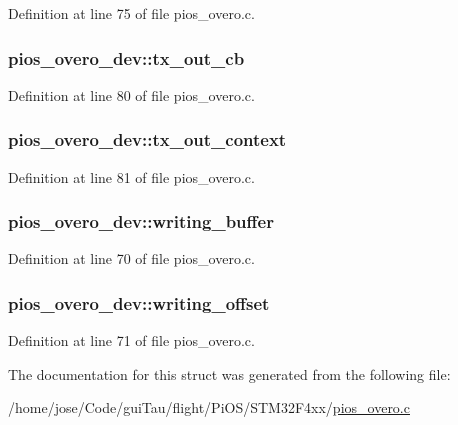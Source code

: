 Definition at line 75 of file pios\-\_\-overo.\-c.

\hypertarget{structpios__overo__dev_a6814eae0437a37c8b5319b0ef88b7459}{
\subsubsection[{tx\-\_\-out\-\_\-cb}]{ pios\-\_\-overo\-\_\-dev\-::tx\-\_\-out\-\_\-cb}}\label{structpios__overo__dev_a6814eae0437a37c8b5319b0ef88b7459}


Definition at line 80 of file pios\-\_\-overo.\-c.

\hypertarget{structpios__overo__dev_aae8b1053ce480f2829ac18c7a490c010}{
\subsubsection[{tx\-\_\-out\-\_\-context}]{ pios\-\_\-overo\-\_\-dev\-::tx\-\_\-out\-\_\-context}}\label{structpios__overo__dev_aae8b1053ce480f2829ac18c7a490c010}


Definition at line 81 of file pios\-\_\-overo.\-c.

\hypertarget{structpios__overo__dev_a87dbb1f454559bb6df624368972b0cf6}{
\subsubsection[{writing\-\_\-buffer}]{ pios\-\_\-overo\-\_\-dev\-::writing\-\_\-buffer}}\label{structpios__overo__dev_a87dbb1f454559bb6df624368972b0cf6}


Definition at line 70 of file pios\-\_\-overo.\-c.

\hypertarget{structpios__overo__dev_a8fc21eb0e95dfbe473205d659e4678f4}{
\subsubsection[{writing\-\_\-offset}]{ pios\-\_\-overo\-\_\-dev\-::writing\-\_\-offset}}\label{structpios__overo__dev_a8fc21eb0e95dfbe473205d659e4678f4}


Definition at line 71 of file pios\-\_\-overo.\-c.



The documentation for this struct was generated from the following file\-:\begin{DoxyCompactItemize}
\item 
/home/jose/\-Code/gui\-Tau/flight/\-Pi\-O\-S/\-S\-T\-M32\-F4xx/\hyperlink{pios__overo_8c}{pios\-\_\-overo.\-c}\end{DoxyCompactItemize}
